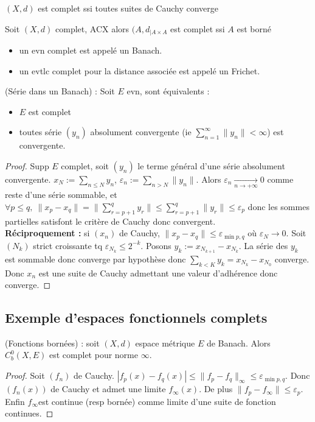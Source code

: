 \begin{definition}
    $(X,d)$ est complet ssi toutes suites de Cauchy converge
\end{definition}
\begin{lemme}
    Soit $(X,d)$ complet, ACX alors $(A,d_{|A\times A}$ est complet ssi $A$ est borné
\end{lemme}


\begin{remarque}
\begin{itemize}
    \item un evn complet est appelé un Banach.
    \item un evtlc complet pour la distance associée est appelé un Frichet.
\end{itemize}
\end{remarque}

\begin{lemme}
    (Série dans un Banach) : Soit $E$ evn, sont équivalents :
    \begin{itemize}
        \item $E$ est complet
        \item toutes série $(y_n)$ absolument convergente (ie $\sum\limits_{n=1}^{\infty} \|y_n\|<\infty $) est convergente.
    \end{itemize}
\end{lemme}
\begin{proof}
    Supp $E$ complet, soit $(y_n)$ le terme général d'une série absolument convergente. $x_N:=\sum\limits_{n\le N}^{} y_n$, $\varepsilon _n:=\sum\limits_{n>N}^{} \|y_n\|$. Alors $\varepsilon _n \xrightarrow[n\to +\infty]{} 0$ comme reste d'une série sommable, et $\forall p\le q,\ \|x_p-x_q\|=\|\sum\limits_{r=p+1}^{q} y_r\|\le \sum\limits_{r=p+1}^{q} \|y_r\|\le \varepsilon _p $ donc les sommes partielles satisfont le critère de Cauchy donc convergent.\\
    \textbf{Réciproquement :} si $(x_{n})$ de Cauchy, $\|x_p-x_q\|\le \varepsilon _{\min p,q}$ où $\varepsilon _N\to 0$. Soit $(N_k)$ strict croissante tq $\varepsilon _{N_k}\le 2^{-k}$. Posons $y_k:=x_{N_{k+1}}-x_{N_k}$. La série des $y_k$ est sommable donc converge par hypothèse donc $\sum\limits_{k<K}^{} y_k=x_{N_k}-x_{N_0}$ converge. Donc $x_{n}$ est une suite de Cauchy admettant une valeur d'adhérence donc converge.
\end{proof}


\subsection{Exemple d'espaces fonctionnels complets}
\begin{ex}
    (Fonctions bornées) : soit $(X,d)$ espace métrique $E$ de Banach. Alors $C^0_b(X,E)$ est complet pour norme $\infty $.
\end{ex}
\begin{proof}
    Soit $(f_n)$ de Cauchy. $|f_p(x)-f_q(x)|\le \|f_p-f_q\|_\infty \le \varepsilon _{\min p,q}$. Donc $(f_n(x))$ de Cauchy et admet une limite $f_\infty (x)$. De plus $\|f_p-f_\infty \|\le \varepsilon _p$. Enfin $f_\infty $est continue (resp bornée) comme limite d'une suite de fonction continues.
\end{proof}


